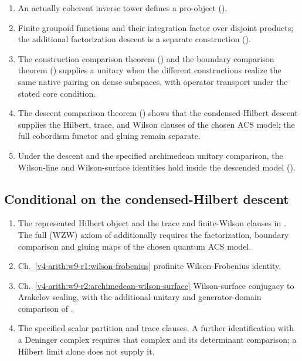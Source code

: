 \begin{enumerate}
\item An actually coherent inverse tower defines a pro-object
().
\item Finite groupoid functions and their integration factor over
disjoint products; the additional factorization descent is a
separate construction
().
\item The construction comparison theorem
() and the
boundary comparison theorem
() supplies a unitary when
the different constructions realize the same native pairing on
dense subspaces, with operator transport under the stated core condition.
\item The descent comparison theorem
() shows that the
condensed-Hilbert descent supplies the Hilbert, trace, and Wilson
clauses of the chosen ACS model; the full cobordism functor and gluing
remain separate.
\item Under the descent and the specified archimedean unitary
comparison, the Wilson-line and Wilson-surface identities hold
inside the descended model
().
\end{enumerate}

\subsection*{Conditional on the condensed-Hilbert descent}

\begin{enumerate}
\item The represented Hilbert object and the trace and finite-Wilson
clauses in .
The full (WZW) axiom of 
additionally requires the factorization, boundary comparison and gluing
maps of the chosen quantum ACS model.
\item Ch.~\ref{v4-arith:w9-r1:wilson-frobenius} profinite
Wilson-Frobenius identity.
\item Ch.~\ref{v4-arith:w9-r2:archimedean-wilson-surface}
Wilson-surface conjugacy to Arakelov scaling, with the additional
unitary and generator-domain comparison of
.
\item The specified scalar partition and trace clauses. A further
identification with a Deninger complex requires that complex and
its determinant comparison; a Hilbert limit alone does not supply it.
\end{enumerate}

